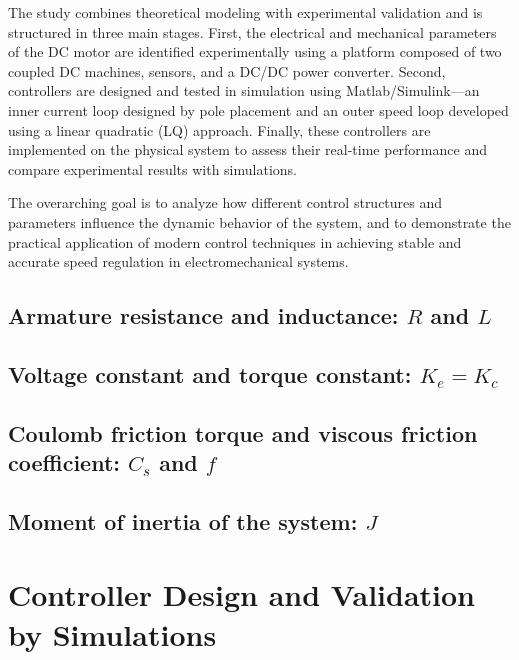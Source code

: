 \documentclass{rapportCS}
\begin{document}
The study combines theoretical modeling with experimental validation and is structured in three main stages. First, the electrical and mechanical parameters of the DC motor are identified experimentally using a platform composed of two coupled DC machines, sensors, and a DC/DC power converter. Second, controllers are designed and tested in simulation using Matlab/Simulink---an inner current loop designed by pole placement and an outer speed loop developed using a linear quadratic (LQ) approach. Finally, these controllers are implemented on the physical system to assess their real-time performance and compare experimental results with simulations.

The overarching goal is to analyze how different control structures and parameters influence the dynamic behavior of the system, and to demonstrate the practical application of modern control techniques in achieving stable and accurate speed regulation in electromechanical systems.

\subsection{Armature resistance and inductance: $R$ and $L$}


\subsection{Voltage constant and torque constant: $K_e = K_c$}


\subsection{Coulomb friction torque and viscous friction coefficient: $C_s$ and $f$}


\subsection{Moment of inertia of the system: $J$}





\newpage

\section{Controller Design and Validation by Simulations}
\lipsum[4-6]
\end{document}
